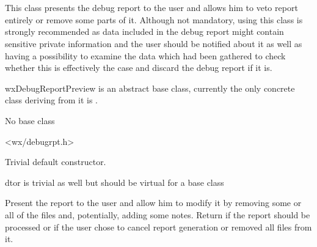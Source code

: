 
\section{}\label{wxdebugreportpreview}

This class presents the debug report to the user and allows him to veto report
entirely or remove some parts of it. Although not mandatory, using this class
is strongly recommended as data included in the debug report might contain
sensitive private information and the user should be notified about it as well
as having a possibility to examine the data which had been gathered to check
whether this is effectively the case and discard the debug report if it is.

wxDebugReportPreview is an abstract base class, currently the only concrete
class deriving from it is 
.


No base class


<wx/debugrpt.h>




\label{wxdebugreportpreviewwxdebugreportpreview}


Trivial default constructor.


\label{wxdebugreportpreviewdtor}


dtor is trivial as well but should be virtual for a base class


\label{wxdebugreportpreviewshow}


Present the report to the user and allow him to modify it by removing some or
all of the files and, potentially, adding some notes. Return \true if the
report should be processed or \false if the user chose to cancel report
generation or removed all files from it.

